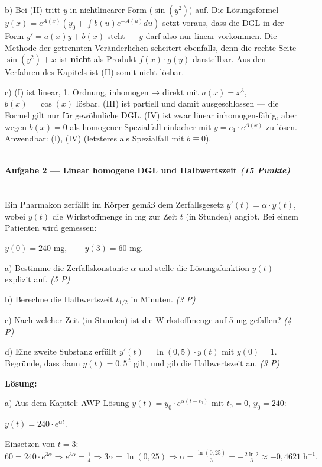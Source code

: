 \documentclass[11pt, a4paper]{article}
\begin{document}
b) Bei (II) tritt $y$ in nichtlinearer Form ($\sin(y^2)$) auf. Die Lösungsformel $y(x)=e^{A(x)}(y_0+\int b(u)e^{-A(u)}du)$ setzt voraus, dass die DGL in der Form $y'=a(x)y+b(x)$ steht — $y$ darf also nur linear vorkommen. Die Methode der getrennten Veränderlichen scheitert ebenfalls, denn die rechte Seite $\sin(y^2)+x$ ist \textbf{nicht} als Produkt $f(x)\cdot g(y)$ darstellbar. Aus den Verfahren des Kapitels ist (II) somit nicht lösbar.


c) (I) ist linear, 1. Ordnung, inhomogen → direkt mit $a(x)=x^3$, $b(x)=\cos(x)$ lösbar. (III) ist partiell und damit ausgeschlossen — die Formel gilt nur für gewöhnliche DGL. (IV) ist zwar linear inhomogen-fähig, aber wegen $b(x)=0$ als homogener Spezialfall einfacher mit $y=c_1\cdot e^{A(x)}$ zu lösen. Anwendbar: (I), (IV) (letzteres als Spezialfall mit $b\equiv 0$).



\noindent\textcolor{rulegray}{\rule{\linewidth}{0.4pt}}


\paragraph{Aufgabe 2 — Linear homogene DGL und Halbwertszeit \textit{(15 Punkte)}}\mbox{}\\[2pt]

Ein Pharmakon zerfällt im Körper gemäß dem Zerfallsgesetz $y'(t) = \alpha \cdot y(t)$, wobei $y(t)$ die Wirkstoffmenge in mg zur Zeit $t$ (in Stunden) angibt. Bei einem Patienten wird gemessen:

$y(0) = 240\text{ mg}, \qquad y(3) = 60\text{ mg}.$


a) Bestimme die Zerfallskonstante $\alpha$ und stelle die Lösungsfunktion $y(t)$ explizit auf. \textit{(5 P)}

b) Berechne die Halbwertszeit $t_{1/2}$ in Minuten. \textit{(3 P)}

c) Nach welcher Zeit (in Stunden) ist die Wirkstoffmenge auf 5 mg gefallen? \textit{(4 P)}

d) Eine zweite Substanz erfüllt $y'(t) = \ln(0{,}5)\cdot y(t)$ mit $y(0)=1$. Begründe, dass dann $y(t)=0{,}5^{\,t}$ gilt, und gib die Halbwertszeit an. \textit{(3 P)}


\textbf{Lösung:}


a) Aus dem Kapitel: AWP-Lösung $y(t)=y_0\cdot e^{\alpha(t-t_0)}$ mit $t_0=0$, $y_0=240$:

$y(t)=240\cdot e^{\alpha t}.$

Einsetzen von $t=3$: $60 = 240\cdot e^{3\alpha} \Rightarrow e^{3\alpha}= \tfrac{1}{4} \Rightarrow 3\alpha=\ln(0{,}25) \Rightarrow \alpha=\tfrac{\ln(0{,}25)}{3}=-\tfrac{2\ln 2}{3}\approx -0{,}4621\;\text{h}^{-1}.$
\end{document}
